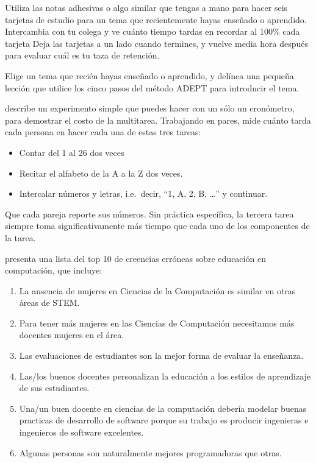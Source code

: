 
Utiliza las notas adhesivas o algo similar que tengas a mano
para hacer seis tarjetas de estudio
para un tema que recientemente hayas enseñado o aprendido.
Intercambia con tu colega y ve cuánto tiempo tardas en recordar 
al 100\% cada tarjeta
Deja las tarjetas a un lado cuando termines,
y vuelve media hora después para evaluar cuál es tu taza de retención.


Elige un tema que recién hayas enseñado o aprendido,
y delínea una pequeña lección que utilice los cinco pasos del método ADEPT para introducir el tema.


describe un experimento simple que puedes hacer con un sólo un cronómetro, 
para demostrar el costo de la multitarea.
Trabajando en pares,
mide cuánto tarda cada persona en hacer cada una de estas tres tareas:

\begin{itemize}
\item
  Contar del 1 al 26 dos veces
\item
  Recitar el alfabeto de la A a la Z dos veces.
\item
  Intercalar números y letras,
  i.e.\ decir, ``1, A, 2, B, {\ldots}''
  y continuar.
\end{itemize}

Que cada pareja reporte sus números.
Sin práctica específica,
la tercera tarea siempre toma significativamente más tiempo que cada uno de los componentes de la tarea.


\cite{Guzd2015b} presenta una lista del top 10 de creencias erróneas sobre educación en computación,
que incluye:

\begin{enumerate}
\item
  La ausencia de mujeres en Ciencias de la Computación es similar en otras áreas de STEM.
\item
  Para tener más mujeres en las Ciencias de Computación necesitamos más docentes mujeres en el área.
\item
  Las evaluaciones de estudiantes son la mejor forma de evaluar la enseñanza.
\item
  Las/los buenos docentes personalizan la educación a los estilos de aprendizaje de sus estudiantes.
\item
  Una/un buen docente en ciencias de la computación debería modelar buenas practicas de desarrollo de software porque su trabajo es producir ingenieras e ingenieros de software excelentes.
\item
  Algunas personas son naturalmente mejores programadoras que otras.
\end{enumerate}


